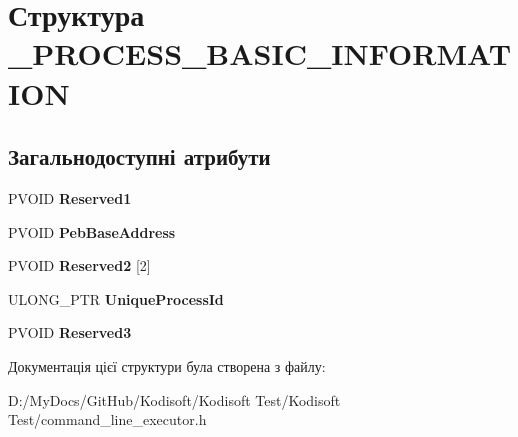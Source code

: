 \hypertarget{struct___p_r_o_c_e_s_s___b_a_s_i_c___i_n_f_o_r_m_a_t_i_o_n}{\section{Структура \+\_\+\+P\+R\+O\+C\+E\+S\+S\+\_\+\+B\+A\+S\+I\+C\+\_\+\+I\+N\+F\+O\+R\+M\+A\+T\+I\+O\+N}
\label{struct___p_r_o_c_e_s_s___b_a_s_i_c___i_n_f_o_r_m_a_t_i_o_n}
}
\subsection*{Загальнодоступні атрибути}
\begin{DoxyCompactItemize}
\item 
\hypertarget{struct___p_r_o_c_e_s_s___b_a_s_i_c___i_n_f_o_r_m_a_t_i_o_n_ac25372bf10c8a8ebac9d189bc0e6ecdc}{P\+V\+O\+I\+D {\bfseries Reserved1}}\label{struct___p_r_o_c_e_s_s___b_a_s_i_c___i_n_f_o_r_m_a_t_i_o_n_ac25372bf10c8a8ebac9d189bc0e6ecdc}

\item 
\hypertarget{struct___p_r_o_c_e_s_s___b_a_s_i_c___i_n_f_o_r_m_a_t_i_o_n_a411f27dee3e5ef61626c15e1b64cc058}{P\+V\+O\+I\+D {\bfseries Peb\+Base\+Address}}\label{struct___p_r_o_c_e_s_s___b_a_s_i_c___i_n_f_o_r_m_a_t_i_o_n_a411f27dee3e5ef61626c15e1b64cc058}

\item 
\hypertarget{struct___p_r_o_c_e_s_s___b_a_s_i_c___i_n_f_o_r_m_a_t_i_o_n_ac89c5f2b3af610c8748dcc3c5790a061}{P\+V\+O\+I\+D {\bfseries Reserved2} \mbox{[}2\mbox{]}}\label{struct___p_r_o_c_e_s_s___b_a_s_i_c___i_n_f_o_r_m_a_t_i_o_n_ac89c5f2b3af610c8748dcc3c5790a061}

\item 
\hypertarget{struct___p_r_o_c_e_s_s___b_a_s_i_c___i_n_f_o_r_m_a_t_i_o_n_afe6e56b5ae0aff9044ee218c86f59f2d}{U\+L\+O\+N\+G\+\_\+\+P\+T\+R {\bfseries Unique\+Process\+Id}}\label{struct___p_r_o_c_e_s_s___b_a_s_i_c___i_n_f_o_r_m_a_t_i_o_n_afe6e56b5ae0aff9044ee218c86f59f2d}

\item 
\hypertarget{struct___p_r_o_c_e_s_s___b_a_s_i_c___i_n_f_o_r_m_a_t_i_o_n_a88b84e8b2c7f6c241ea9e20e8376abaf}{P\+V\+O\+I\+D {\bfseries Reserved3}}\label{struct___p_r_o_c_e_s_s___b_a_s_i_c___i_n_f_o_r_m_a_t_i_o_n_a88b84e8b2c7f6c241ea9e20e8376abaf}

\end{DoxyCompactItemize}


Документація цієї структури була створена з файлу\+:\begin{DoxyCompactItemize}
\item 
D\+:/\+My\+Docs/\+Git\+Hub/\+Kodisoft/\+Kodisoft Test/\+Kodisoft Test/command\+\_\+line\+\_\+executor.\+h\end{DoxyCompactItemize}
